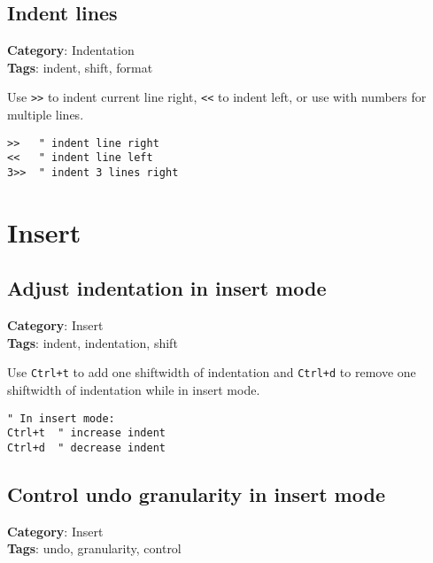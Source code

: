 {{{{{\section{Indent lines}

\textbf{Category}: Indentation\\ \textbf{Tags}: indent, shift, format
\vspace{0.5cm}

Use {\footnotesize \Verb§>>§} to indent current line right, {\footnotesize \Verb§<<§} to indent left, or use with numbers for multiple lines.

\begin{Exa*}{}
\begin{Verbatim}[fontsize=\footnotesize, breaklines, breakanywhere]
>>   " indent line right
<<   " indent line left
3>>  " indent 3 lines right
\end{Verbatim}
\end{Exa*}

\chapter{Insert}
\section{Adjust indentation in insert mode}

\textbf{Category}: Insert\\ \textbf{Tags}: indent, indentation, shift
\vspace{0.5cm}

Use {\footnotesize \Verb§Ctrl+t§} to add one shiftwidth of indentation and {\footnotesize \Verb§Ctrl+d§} to remove one shiftwidth of indentation while in insert mode.

\begin{Exa*}{}
\begin{Verbatim}[fontsize=\footnotesize, breaklines, breakanywhere]
" In insert mode:
Ctrl+t  " increase indent
Ctrl+d  " decrease indent
\end{Verbatim}
\end{Exa*}

\section{Control undo granularity in insert mode}

\textbf{Category}: Insert\\ \textbf{Tags}: undo, granularity, control
\vspace{0.5cm}

}}}}}
